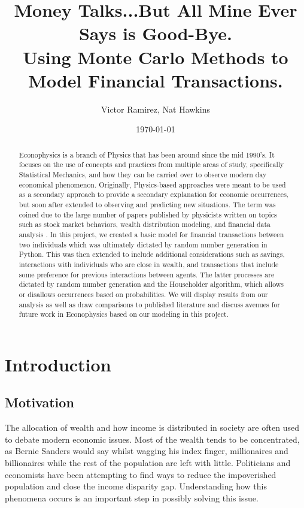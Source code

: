 \documentclass[11pt]{article}
\title{Money Talks...But All Mine Ever Says is Good-Bye.\\ Using Monte Carlo Methods to Model Financial Transactions.}
\author{Victor Ramirez, Nat Hawkins}
\date{\today}
\begin{document}
	\maketitle
	\begin{abstract}
		Econophysics is a branch of Physics that has been around since the mid 1990's. It focuses on the use of concepts and practices from multiple areas of study, specifically Statistical Mechanics, and how they can be carried over to observe modern day economical phenomenon. Originally, Physics-based approaches were meant to be used as a secondary approach to provide a secondary explanation for economic occurrences, but soon after extended to observing and predicting new situations. The term was coined due to the large number of papers published by physicists written on topics such as stock market behaviors, wealth distribution modeling, and financial data analysis \cite{wikipedia}. In this project, we created a basic model for financial transactions between two individuals which was ultimately dictated by random number generation in Python. This was then extended to include additional considerations such as savings, interactions with individuals who are close in wealth, and transactions that include some preference for previous interactions between agents. The latter processes are dictated by random number generation and the Householder algorithm, which allows or disallows occurrences based on probabilities. We will display results from our analysis as well as draw comparisons to published literature and discuss avenues for future work in Econophysics based on our modeling in this project. 
	\end{abstract}
	\newpage
	
	\section{Introduction}
	
	
	\subsection{Motivation}
	The allocation of wealth and how income is distributed in society are often used to debate modern economic issues. Most of the wealth tends to be concentrated, as Bernie Sanders would say whilst wagging his index finger, millionaires and billionaires while the rest of the population are left with little. Politicians and economists have been attempting to find ways to reduce the impoverished population and close the income disparity gap. Understanding how this phenomena occurs is an important step in possibly solving this issue.
	
\end{document}

